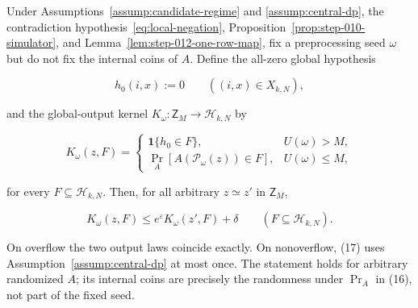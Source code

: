 \begin{proposition}\label{prop:step-012-fixed-seed-kernel}
Under Assumptions~\ref{assump:candidate-regime} and
\ref{assump:central-dp}, the contradiction hypothesis~\eqref{eq:local-negation}, Proposition~\ref{prop:step-010-simulator}, and
Lemma~\ref{lem:step-012-one-row-map}, fix a preprocessing seed \(\omega\)
but do not fix the internal coins of \(A\).  Define the all-zero global
hypothesis

\[
  h_0(i,x):=0
  \qquad ((i,x)\in X_{k,N}),
\tag{15}
\]

and the global-output kernel \(K_\omega:\mathsf Z_M\to\mathcal H_{k,N}\)
by

\[
  K_\omega(z,F)=
  \begin{cases}
    \mathbf1\{h_0\in F\}, & U(\omega)>M,\\[1mm]
    \Pr_A\!\left[A(\mathcal P_\omega(z))\in F\right],
      & U(\omega)\le M,
  \end{cases}
\tag{16}
\]

for every \(F\subseteq\mathcal H_{k,N}\).  Then, for all arbitrary
\(z\simeq z'\) in \(\mathsf Z_M\),

\[
  K_\omega(z,F)
  \le e^\varepsilon K_\omega(z',F)+\delta
  \qquad(F\subseteq\mathcal H_{k,N}).
\tag{17}
\]

On overflow the two output laws coincide exactly.  On nonoverflow, (17)
uses Assumption~\ref{assump:central-dp} at most once.  The statement holds
for arbitrary randomized \(A\); its internal coins are precisely the
randomness under \(\Pr_A\) in (16), not part of the fixed seed.
\end{proposition}

